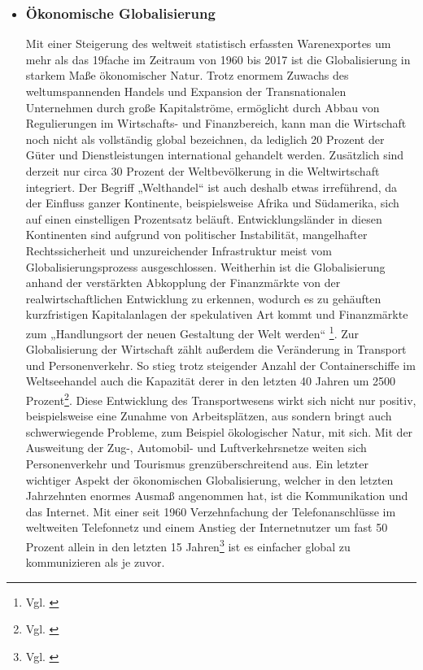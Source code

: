 \documentclass[12pt]{article}
\begin{document}
\begin{itemize}
    \item \subsubsection{Ökonomische Globalisierung}
    Mit einer Steigerung des weltweit statistisch erfassten Warenexportes um mehr als das 19fache im Zeitraum von 1960 bis 2017 ist die Globalisierung in starkem Maße ökonomischer Natur. Trotz enormem Zuwachs des weltumspannenden Handels und Expansion der Transnationalen Unternehmen durch große Kapitalströme, ermöglicht durch Abbau von Regulierungen im Wirtschafts- und Finanzbereich, kann man die Wirtschaft noch nicht als vollständig global bezeichnen, da lediglich 20 Prozent der Güter und Dienstleistungen international gehandelt werden. Zusätzlich sind derzeit nur circa 30 Prozent der Weltbevölkerung in die Weltwirtschaft integriert. Der Begriff „Welthandel“ ist auch deshalb etwas irreführend, da der Einfluss ganzer Kontinente, beispielsweise Afrika und Südamerika, sich auf einen einstelligen Prozentsatz beläuft. Entwicklungsländer in diesen Kontinenten sind aufgrund von politischer Instabilität, mangelhafter Rechtssicherheit und unzureichender Infrastruktur meist vom Globalisierungsprozess ausgeschlossen. Weitherhin ist die Globalisierung anhand der verstärkten Abkopplung der Finanzmärkte von der realwirtschaftlichen Entwicklung zu erkennen, wodurch es zu gehäuften kurzfristigen Kapitalanlagen der spekulativen Art kommt und Finanzmärkte zum „Handlungsort der neuen Gestaltung der Welt werden“ \footnote{Vgl. \cite{Renz2001}}. Zur Globalisierung der Wirtschaft zählt außerdem die Veränderung in Transport und Personenverkehr. So stieg trotz steigender Anzahl der Containerschiffe im Weltseehandel auch die Kapazität derer in den letzten 40 Jahren um 2500 Prozent\footnote{Vgl. \cite{Keller2021}}. Diese Entwicklung des Transportwesens wirkt sich nicht nur positiv, beispielsweise eine Zunahme von Arbeitsplätzen, aus sondern bringt auch schwerwiegende Probleme, zum Beispiel ökologischer Natur, mit sich. Mit der Ausweitung der Zug-, Automobil- und Luftverkehrsnetze weiten sich Personenverkehr und Tourismus grenzüberschreitend aus. Ein letzter wichtiger Aspekt der ökonomischen Globalisierung, welcher in den letzten Jahrzehnten enormes Ausmaß angenommen hat, ist die Kommunikation und das Internet. Mit einer seit 1960 Verzehnfachung der Telefonanschlüsse im weltweiten Telefonnetz und einem Anstieg der Internetnutzer um fast 50 Prozent allein in den letzten 15 Jahren\footnote{Vgl. \cite{Rabe2021}} ist es einfacher global zu kommunizieren als je zuvor.

\end{itemize}
\end{document}
